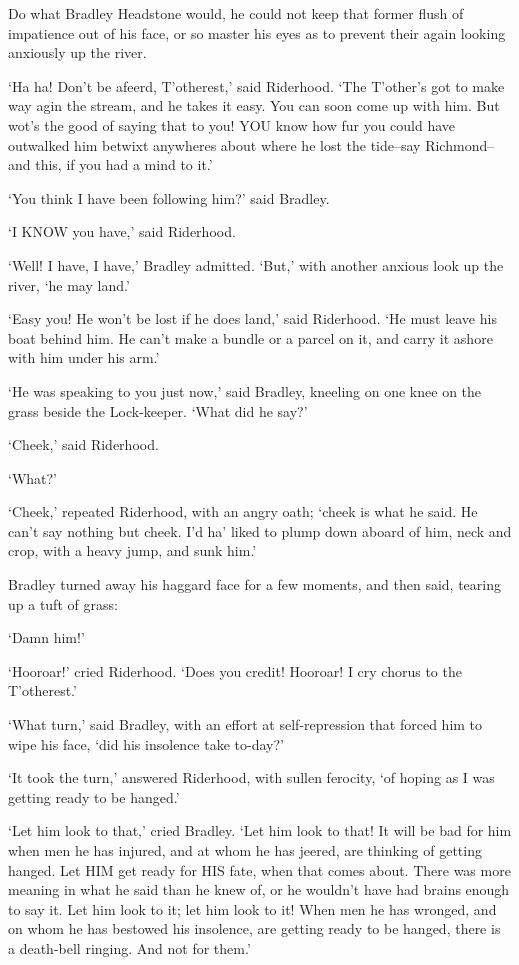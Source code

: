 Do what Bradley Headstone would, he could not keep that former flush of
impatience out of his face, or so master his eyes as to prevent their
again looking anxiously up the river.

‘Ha ha! Don’t be afeerd, T’otherest,’ said Riderhood. ‘The T’other’s got
to make way agin the stream, and he takes it easy. You can soon come up
with him. But wot’s the good of saying that to you! YOU know how fur
you could have outwalked him betwixt anywheres about where he lost the
tide--say Richmond--and this, if you had a mind to it.’

‘You think I have been following him?’ said Bradley.

‘I KNOW you have,’ said Riderhood.

‘Well! I have, I have,’ Bradley admitted. ‘But,’ with another anxious
look up the river, ‘he may land.’

‘Easy you! He won’t be lost if he does land,’ said Riderhood. ‘He must
leave his boat behind him. He can’t make a bundle or a parcel on it, and
carry it ashore with him under his arm.’

‘He was speaking to you just now,’ said Bradley, kneeling on one knee on
the grass beside the Lock-keeper. ‘What did he say?’

‘Cheek,’ said Riderhood.

‘What?’

‘Cheek,’ repeated Riderhood, with an angry oath; ‘cheek is what he said.
He can’t say nothing but cheek. I’d ha’ liked to plump down aboard of
him, neck and crop, with a heavy jump, and sunk him.’

Bradley turned away his haggard face for a few moments, and then said,
tearing up a tuft of grass:

‘Damn him!’

‘Hooroar!’ cried Riderhood. ‘Does you credit! Hooroar! I cry chorus to
the T’otherest.’

‘What turn,’ said Bradley, with an effort at self-repression that forced
him to wipe his face, ‘did his insolence take to-day?’

‘It took the turn,’ answered Riderhood, with sullen ferocity, ‘of hoping
as I was getting ready to be hanged.’

‘Let him look to that,’ cried Bradley. ‘Let him look to that! It will
be bad for him when men he has injured, and at whom he has jeered, are
thinking of getting hanged. Let HIM get ready for HIS fate, when that
comes about. There was more meaning in what he said than he knew of, or
he wouldn’t have had brains enough to say it. Let him look to it; let
him look to it! When men he has wronged, and on whom he has bestowed
his insolence, are getting ready to be hanged, there is a death-bell
ringing. And not for them.’

